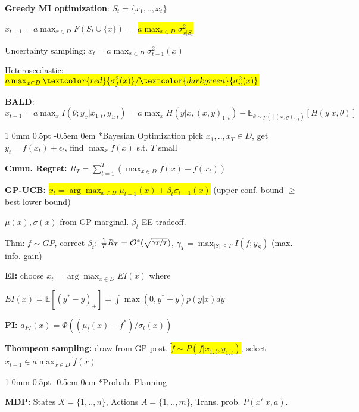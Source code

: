 \documentclass[11pt,landscape,a4paper,fleqn]{article}
\makeatletter
\newcommand*{\rsection}{%
	\@startsection{section}%
	{1}%
	{0mm}%
	{0.5pt}%
	{-0.5em \@plus 0em}
	{\color{myorange}\sffamily\small\bfseries}}
\newcommand{\mhl}[1]{\setlength{\fboxsep}{0pt}\colorbox{yellow}{#1}}
\makeatother
\begin{document}
\begin{multicols*}{4}
		\textbf{Greedy MI optimization}: $S_t = \{x_1,.., x_t\}$

	$x_{t+1} = a\max_{x \in D} F(S_t \cup \{x\}) = $ \mhl{$a\max_{x \in D} \sigma_{x | S_t}^2$}

		\iffalse
		\vspace*{-1mm}
	$\rightarrow$ constant-factor near optimal.
		\vspace*{-1mm}
		\fi

		Uncertainty sampling: $x_t = a\max_{x \in D} \sigma_{t-1}^2(x)$

		Heteroscedastic: \mhl{$a\max_{x \in D} {\textcolor{red}{\sigma_f^2(x)}}/{\textcolor{darkgreen}{\sigma_n^2(x)}}$}


		\textbf{BALD}: $x_{t+1} = a\max_x I(\theta; y_x | x_{1:t}, y_{1:t}) = a\max_x H(y | x, (x,y)_{1:t}) - \mathbb{E}_{\theta \sim p(\cdot | (x,y)_{1:t})}[H(y | x, \theta)]$

		\vspace*{1mm}
		\rsection*{Bayesian Optimization} pick $x_1,..,x_T \in D$, get $y_t = f(x_t) + \epsilon_t$, find $\max_x f(x)$ s.t. $T$ small

		\textbf{Cumu. Regret:} $R_T = \sum_{t=1}^{T} \left( \max_{x \in D} f(x) - f(x_t) \right)$

		\textbf{GP-UCB:} \mhl{$x_t = \arg\max_{x \in D} \mu_{t-1}(x) + \beta_t \sigma_{t-1}(x)$}
		(upper conf. bound $\geq$ best lower bound)

	$\mu(x), \sigma(x)$ from GP marginal. $\beta_t$ EE-tradeoff.

		Thm: $f \sim GP$, correct $\beta_t$: $\frac{1}{T}R_T = \mathcal{O}^*(\sqrt{\nicefrac{\gamma_T}{T}})$, $\gamma_T = \max_{|S| \leq T} I(f; y_S)$ (max. info. gain)

		\textbf{EI:} choose $x_t = \arg\max_{x \in D} EI(x)$ where

	$EI(x) = \mathbb{E}[(y^* - y)_+] = \int \max(0, y^* - y) p(y | x) dy $
			
		\textbf{PI:} $a_{PI}(x) = \Phi((\mu_t(x) - f^*)/ \sigma_t(x))$

		\textbf{Thompson sampling:} %
		draw from GP post. 
		\mhl{$\tilde{f} \sim P(f | x_{1:t}, y_{1:t})$}, select $x_{t+1} \in a\max_{x \in D} \tilde{f}(x)$


		\rsection*{Probab. Planning}

		\textbf{MDP:}
		States $X = \{1,..,n\}$,
		Actions $A = \{1,..,m\}$,
		Trans. prob. $P(x' | x,a)$.


\end{multicols*}
\end{document}
